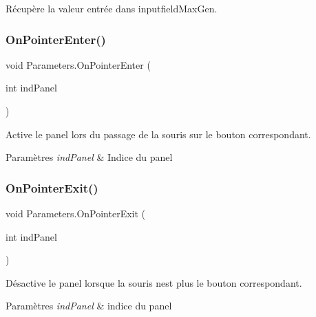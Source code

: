 Récupère la valeur entrée dans inputfield\+Max\+Gen. 

\mbox{\label{class_parameters_aa0a97bc80e6c1cdf8a43513c187f33aa}} 
\subsubsection{\texorpdfstring{On\+Pointer\+Enter()}{OnPointerEnter()}}
{\footnotesize\ttfamily void Parameters.\+On\+Pointer\+Enter (\begin{DoxyParamCaption}\item[{int}]{ind\+Panel }\end{DoxyParamCaption})\hspace{0.3cm}{\ttfamily [inline]}}



Active le panel lors du passage de la souris sur le bouton correspondant. 


\begin{DoxyParams}{Paramètres}
{\em ind\+Panel} & Indice du panel\\
\hline
\end{DoxyParams}
\mbox{\label{class_parameters_a711df8be88106725f5e1cf4bf74a5e21}} 
\subsubsection{\texorpdfstring{On\+Pointer\+Exit()}{OnPointerExit()}}
{\footnotesize\ttfamily void Parameters.\+On\+Pointer\+Exit (\begin{DoxyParamCaption}\item[{int}]{ind\+Panel }\end{DoxyParamCaption})\hspace{0.3cm}{\ttfamily [inline]}}



Désactive le panel lorsque la souris n\textquotesingle{}est plus le bouton correspondant. 


\begin{DoxyParams}{Paramètres}
{\em ind\+Panel} & indice du panel\\
\hline
\end{DoxyParams}
\mbox{\label{class_parameters_ae90c0f90420620d98950ac50b9f24782}} 

